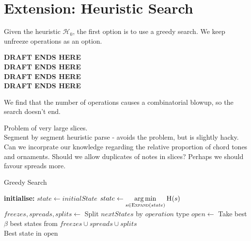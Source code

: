 \documentclass[12pt,a4paper,twoside,openany]{report} \usepackage[pdfborder={0 0 0}]{hyperref}    %
\theoremstyle{definition} \newtheorem{definition}{Definition}[section]
\begin{document}
    \FloatBarrier

    \section{Extension: Heuristic Search} 
    \label{sub:searchImpl}

    Given the heuristic $\mathcal{H}_0$, the first option is to use a greedy
    search. We keep unfreeze operations as an option.

    \textbf{DRAFT ENDS HERE}\\
    \textbf{DRAFT ENDS HERE}\\
    \textbf{DRAFT ENDS HERE}\\
    \textbf{DRAFT ENDS HERE}

    We find that the number of operations causes a combinatorial blowup, so the search doesn't end.

    Problem of very large slices.\\ Segment by segment heuristic parse - avoids the problem, but is slightly hacky. Can
    we incorprate our knowledge regarding the relative proportion of chord tones and ornaments. Should we allow
    duplicates of notes in slices? Perhaps we should favour spreads more. 

    \begin{algorithm}[h] \caption{Greedy Search} \label{code:stbs0} \begin{algorithmic} \State \textbf{initialise:
      } $state \gets initialState$  \State $state \gets \argmin\limits_{s \in
      \Call{Expand}{state}} \Call{H}{s} $ \State $freezes, spreads, splits \gets $ Split $nextStates$ by $operation$
      type \State $open \gets $ Take best $\beta$ best states from $freezes \cup spreads \cup splits$ \EndWhile \\
    \Return Best state in open \end{algorithmic} \end{algorithm}
\end{document}

